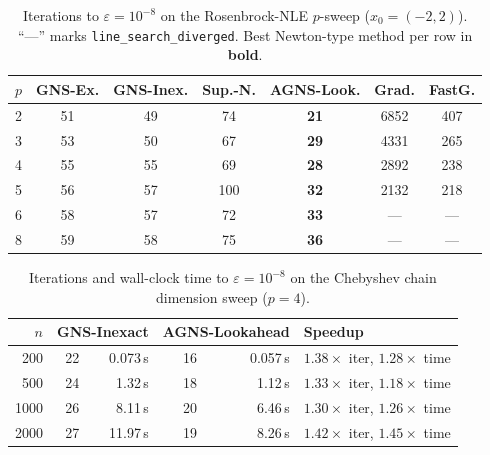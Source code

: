\documentclass[conference]{IEEEtran}
\theoremstyle{remark}
\newcommand{\AGNS}{\textsc{AGNS}}
\begin{document}
\begin{table}[h]
\centering
\small
\caption{Iterations to $\varepsilon=10^{-8}$ on the Rosenbrock-NLE
$p$-sweep ($x_0=(-2,2)$). ``---'' marks
\texttt{line\_search\_diverged}. Best Newton-type method per row in
\textbf{bold}.}
\label{tab:rosenbrock_sweep}
\begin{tabular}{@{}rcccccc@{}}
\toprule
$p$ & GNS-Ex. & GNS-Inex. & Sup.-N. & \AGNS-Look. & Grad. & FastG. \\
\midrule
2 & 51 & 49 & 74  & \textbf{21} & 6852 & 407 \\
3 & 53 & 50 & 67  & \textbf{29} & 4331 & 265 \\
4 & 55 & 55 & 69  & \textbf{28} & 2892 & 238 \\
5 & 56 & 57 & 100 & \textbf{32} & 2132 & 218 \\
6 & 58 & 57 & 72  & \textbf{33} & ---  & --- \\
8 & 59 & 58 & 75  & \textbf{36} & ---  & --- \\
\bottomrule
\end{tabular}
\end{table}

\begin{table}[h]
\centering
\small
\caption{Iterations and wall-clock time to $\varepsilon=10^{-8}$ on
the Chebyshev chain dimension sweep ($p=4$).}
\label{tab:cheb_sweep}
\begin{tabular}{@{}rrrrrl@{}}
\toprule
$n$ & \multicolumn{2}{c}{GNS-Inexact} & \multicolumn{2}{c}{\AGNS-Lookahead} & Speedup \\
\midrule
200  & 22 & 0.073\,s & 16 & 0.057\,s & $1.38\times$ iter, $1.28\times$ time \\
500  & 24 & 1.32\,s  & 18 & 1.12\,s  & $1.33\times$ iter, $1.18\times$ time \\
1000 & 26 & 8.11\,s  & 20 & 6.46\,s  & $1.30\times$ iter, $1.26\times$ time \\
2000 & 27 & 11.97\,s & 19 & 8.26\,s  & $1.42\times$ iter, $1.45\times$ time \\
\bottomrule
\end{tabular}
\end{table}
\end{document}
